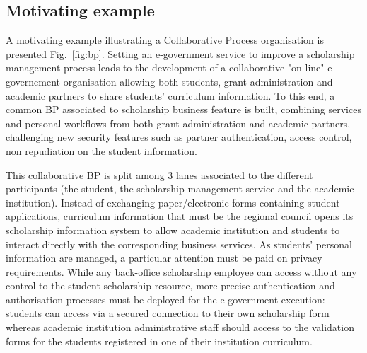 \documentclass[runningheads,a4paper]{llncs}
\begin{document}
\subsection{Motivating example}
\label{example}

A motivating example illustrating a Collaborative Process organisation is presented Fig.~\ref{fig:bp}. Setting an e-government service to improve a scholarship management process leads to the development of a collaborative "on-line" e-governement organisation allowing both students, grant administration and academic partners to share students' curriculum information. To this end, a common BP associated to scholarship business feature is built, combining services and personal workflows from both grant administration and academic partners, challenging new security features such as partner authentication, access control, non repudiation on the student information. 


This collaborative BP is split among 3 lanes associated to the different participants (the student, the scholarship management service and the academic institution). Instead of exchanging paper/electronic forms containing student applications, curriculum information that must be the regional council opens its scholarship information system to allow academic institution and students to interact directly with the corresponding business services. As students' personal information are managed, a particular attention must be paid on privacy requirements. While any back-office scholarship employee can access without any control to the student scholarship resource, more precise authentication and authorisation processes must be deployed for the e-government execution: students can access via a secured connection to their own scholarship form whereas academic institution administrative staff should access to the validation forms for the students registered in one of their institution curriculum.
\end{document}
